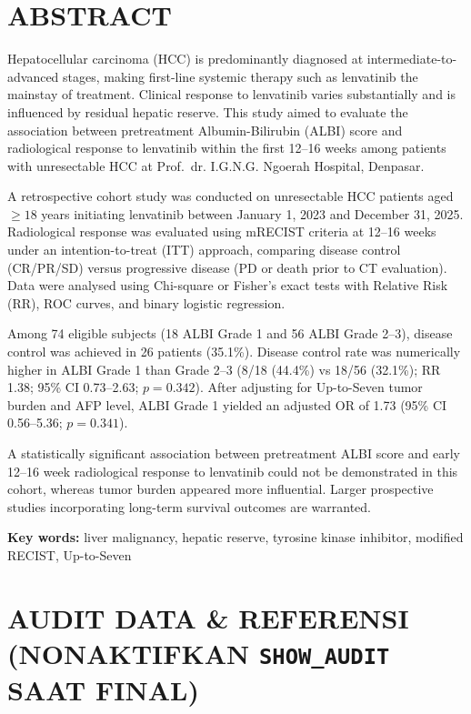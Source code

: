 \documentclass[
  indonesian,
]{report}
\begin{document}
\chapter*{ABSTRACT}\label{abstract}

Hepatocellular carcinoma (HCC) is predominantly diagnosed at
intermediate-to-advanced stages, making first-line systemic therapy such
as lenvatinib the mainstay of treatment. Clinical response to lenvatinib
varies substantially and is influenced by residual hepatic reserve. This
study aimed to evaluate the association between pretreatment
Albumin-Bilirubin (ALBI) score and radiological response to lenvatinib
within the first 12--16 weeks among patients with unresectable HCC at
Prof.~dr. I.G.N.G. Ngoerah Hospital, Denpasar.

A retrospective cohort study was conducted on unresectable HCC patients
aged \(\ge 18\) years initiating lenvatinib between January 1, 2023 and
December 31, 2025. Radiological response was evaluated using mRECIST
criteria at 12--16 weeks under an intention-to-treat (ITT) approach,
comparing disease control (CR/PR/SD) versus progressive disease (PD or
death prior to CT evaluation). Data were analysed using Chi-square or
Fisher's exact tests with Relative Risk (RR), ROC curves, and binary
logistic regression.

Among 74 eligible subjects (18 ALBI Grade 1 and 56 ALBI Grade 2--3),
disease control was achieved in 26 patients (35.1\%). Disease control
rate was numerically higher in ALBI Grade 1 than Grade 2--3 (8/18
(44.4\%) vs 18/56 (32.1\%); RR 1.38; 95\% CI 0.73--2.63; \(p = 0.342\)).
After adjusting for Up-to-Seven tumor burden and AFP level, ALBI Grade 1
yielded an adjusted OR of 1.73 (95\% CI 0.56--5.36; \(p = 0.341\)).

A statistically significant association between pretreatment ALBI score
and early 12--16 week radiological response to lenvatinib could not be
demonstrated in this cohort, whereas tumor burden appeared more
influential. Larger prospective studies incorporating long-term survival
outcomes are warranted.

\textbf{Key words:} liver malignancy, hepatic reserve, tyrosine kinase
inhibitor, modified RECIST, Up-to-Seven

\chapter*{\texorpdfstring{AUDIT DATA \& REFERENSI (NONAKTIFKAN
\texttt{SHOW\_AUDIT} SAAT
FINAL)}{AUDIT DATA \& REFERENSI (NONAKTIFKAN SHOW\_AUDIT SAAT FINAL)}}\label{audit-data-referensi-nonaktifkan-show_audit-saat-final}
\end{document}
